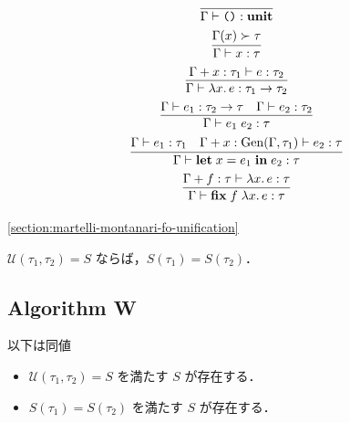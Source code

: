 \begin{gather*}
  \infer{\Gamma \vdash \text{\texttt{()}}: \mathbf{unit}}{}
  \\
  \infer{\Gamma \vdash x: \tau}{
    \Gamma(x) \succ \tau
  }
  \\
  \infer{\Gamma \vdash \lambda x\ldotp e: \tau_1 \to \tau_2}{
    \Gamma + x:\tau_1\vdash e: \tau_2
  }
  \\
  \infer{\Gamma \vdash e_1\; e_2: \tau}{
    \Gamma \vdash e_1: \tau_2 \to \tau
    &
    \Gamma \vdash e_2: \tau_2
  }
  \\
  \infer{\Gamma \vdash \mathbf{let}\; x = e_1\; \mathbf{in}\; e_2: \tau}{
    \Gamma \vdash e_1: \tau_1
    &
    \Gamma + x: \mathrm{Gen}(\Gamma, \tau_1) \vdash e_2: \tau
  }
  \\
  \infer{\Gamma \vdash \mathbf{fix}\;f\;\lambda x\ldotp e: \tau}{
    \Gamma + f: \tau \vdash \lambda x\ldotp e: \tau
  }
\end{gather*}

\cref{section:martelli-montanari-fo-unification}
\begin{theorem}
  $\mathcal{U}(\tau_1, \tau_2) = S$ ならば，$S(\tau_1) = S(\tau_2)$．
\end{theorem}

\subsection{Algorithm W}

\begin{theorem}
  以下は同値
  \begin{itemize}
    \item $\mathcal{U}(\tau_1, \tau_2) = S$ を満たす $S$ が存在する．
    \item $S(\tau_1) = S(\tau_2)$ を満たす $S$ が存在する．
  \end{itemize}
\end{theorem}

